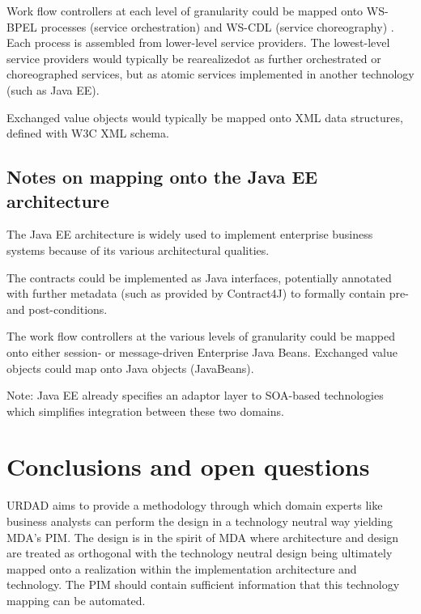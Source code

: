 \documentclass[reviewcopy]{elsart}
\begin{document}
Work flow controllers at each level of granularity could be mapped onto
WS-BPEL processes (service orchestration) \cite{oasis:bpel} and WS-CDL (service choreography) \cite{w3c:cdl}.
Each process is assembled from lower-level service providers.
The lowest-level service providers would typically be
rearealizedot as further orchestrated or choreographed services, but as
atomic services implemented in another technology (such as Java EE).

Exchanged value objects would typically be mapped onto XML data structures,
defined with W3C XML schema. 


\subsection{Notes on mapping onto the Java EE architecture}

The Java EE architecture \cite{sun:javaee} is widely used to implement 
enterprise business systems because of its various architectural qualities.

The contracts could be implemented as Java interfaces, potentially annotated
with further metadata (such as provided by Contract4J) to formally
contain pre- and post-conditions.

The work flow controllers at the various levels of granularity could be
mapped onto either session- or message-driven Enterprise Java Beans. 
Exchanged value objects could map onto Java objects (JavaBeans).

Note: Java EE already specifies an adaptor layer to SOA-based technologies
which simplifies integration between these two domains. \cite{sun:soaWithJavaee}


\section{Conclusions and open questions}

URDAD aims to provide a methodology through which domain experts like business
analysts can perform the design in a technology neutral way yielding MDA's PIM.
The design is in the spirit of MDA where architecture and design are treated as
orthogonal with the technology neutral design being ultimately mapped onto a
realization within the implementation architecture and technology. The PIM
should contain sufficient information that this technology mapping can be
automated.
\end{document}
